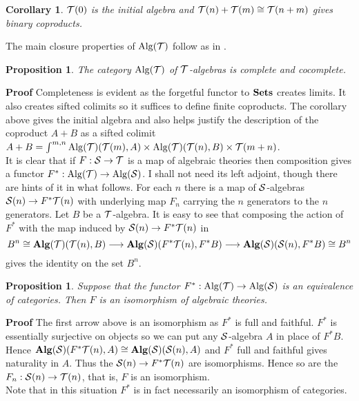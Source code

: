 \documentclass[12pt, amstex, amssymb]{article}
\newtheorem{proposition}[theorem]{Proposition}
\newtheorem{corollary}[theorem]{Corollary}
\newcommand{\mcat}{\cal}
\begin{document}
\begin{corollary}\label{corolcoprod} ${\mcat T}(0)$ is the initial algebra and
${\mcat T}(n) + {\mcat T}(m) \cong {\mcat T}(n+m)$ gives binary coproducts.
\end{corollary}
The main closure properties of ${\rm Alg}({\mcat T})$ follow as in
\cite{ARV11}.
\begin{proposition}
The category ${\rm Alg}({\mcat T})$ of $\mcat T$-algebras is complete
and cocomplete.
\end{proposition}
{\bf Proof}
Completeness is evident as the forgetful functor to $\bf Sets$
creates limits. It also creates sifted colimits so it suffices
to define finite coproducts. The corollary above gives
the initial algebra and also helps justify the description
of the coproduct $A + B$ as a sifted colimit
$A + B = \int^{m,n} {\rm Alg}({\mcat T})({\mcat T}(m), A)
\times {\rm Alg}({\mcat T})({\mcat T}(n), B) \times{\mcat T}(m+n)$.\\[0.4em]
It is clear that if $F: {\mcat S} \to {\mcat T}$
is a map of algebraic theories then composition gives a
functor $F^*:{\rm Alg}({\mcat T}) \to {\rm Alg}({\mcat S})$.
I shall not need its left adjoint, though there are hints of it
in what follows. For each $n$ there is a map of
$\mcat S$-algebras ${\mcat S}(n) \to F^*{\mcat T}(n)$ with underlying
map $F_n$ carrying the $n$ generators
to the $n$ generators.  Let
$B$ be a $\mcat T$-algebra. It is easy to see that composing the
action of $F^*$ with the map induced by ${\mcat S}(n) \to F^*{\mcat T}(n)$
in
\[
B^n \cong {\bf Alg}({\mcat T})({\mcat T}(n),B) \longrightarrow
{\bf Alg}({\mcat S})(F^*{\mcat T}(n),F^*B) \longrightarrow
{\bf Alg}({\mcat S})({\mcat S}(n),F^*B) \cong B^n
\]
gives the identity on the set $B^n$.
\begin{proposition}\label{equiv}
Suppose that the functor $F^* :
{\rm Alg}({\mcat T}) \to {\rm Alg}({\mcat S})$ is an equivalence of categories.
Then $F$ is an isomorphism of algebraic theories.
\end{proposition}
{\bf Proof}
The first arrow above is an isomorphism as $F^*$ is full and faithful.
$F^*$ is essentially surjective on objects so we can put
any $\mcat S$-algebra $A$ in place of $F^*B$. Hence 
${\bf Alg}({\mcat S})(F^*{\mcat T}(n),A) \cong
{\bf Alg}({\mcat S})({\mcat S}(n),A)$ and $F^*$
full and faithful gives naturality in $A$. Thus 
the ${\mcat S}(n) \to F^*{\mcat T}(n)$ are isomorphisms.
Hence so are the $F_n : {\mcat S}(n) \to {\mcat T}(n)$, that is,
$F$ is an isomorphism.\\[0.4em]  
Note that in this situation $F^*$ is in
fact necessarily an isomorphism of categories.
\end{document}
